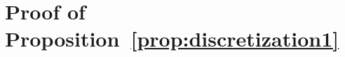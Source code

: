 \documentclass{article}
\newcommand{\bin}{\text{bin}}
\begin{document}
\section{Proof of Proposition~\ref{prop:discretization1}}




\end{document}
